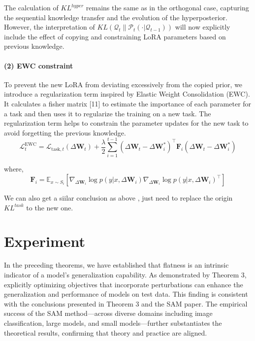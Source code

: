 \documentclass[letterpaper]{article} %
\begin{document}
The calculation of $KL^{{hyper}}$ remains the same as in the orthogonal case, capturing the sequential knowledge transfer and the evolution of the hyperposterior. However, the interpretation of $KL(\mathcal{Q}_t\| \mathcal{P}_t(\cdot | \mathcal{Q}_{t-1}))$  will now explicitly include the effect of copying and constraining LoRA parameters based on previous knowledge.



\paragraph{(2) EWC constraint}

To prevent the new LoRA from deviating excessively from the copied prior, we introduce a regularization term inspired by Elastic Weight Consolidation (EWC). It calculates a fisher matrix [11] to estimate the importance of each parameter for a task and then uses it to regularize the training on a new task. The regularization term helps to constrain the parameter updates for the new task to avoid forgetting the previous knowledge.
\[ \mathcal{L}_t^{\text{EWC}} = \mathcal{L}_{\text{task},t}(\Delta\mathbf{W}_t) + \frac{\lambda}{2} \sum_{i=1}^{t-1} (\Delta\mathbf{W}_t - \Delta\mathbf{W}_i^*)^\top \mathbf{F}_i (\Delta\mathbf{W}_t - \Delta\mathbf{W}_i^*) \]   

where, \[ \mathbf{F}_i = \mathbb{E}_{x \sim S_i} \left[ \nabla_{\Delta\mathbf{W}_i} \log p(y|x, \Delta\mathbf{W}_i) \nabla_{\Delta\mathbf{W}_i} \log p(y|x, \Delta\mathbf{W}_i)^\top \right] \]

We can also get a siilar conclusion as above , just need to replace the origin $KL^{task}$ to the new one.





\section{Experiment}

In the preceding theorems, we have established that flatness is an intrinsic indicator of a model’s generalization capability. As demonstrated by Theorem 3, explicitly optimizing objectives that incorporate perturbations can enhance the generalization and performance of models on test data. This finding is consistent with the conclusions presented in Theorem 3 and the SAM paper. The empirical success of the SAM method—across diverse domains including image classification, large models, and small models—further substantiates the theoretical results, confirming that theory and practice are aligned.
\end{document}
